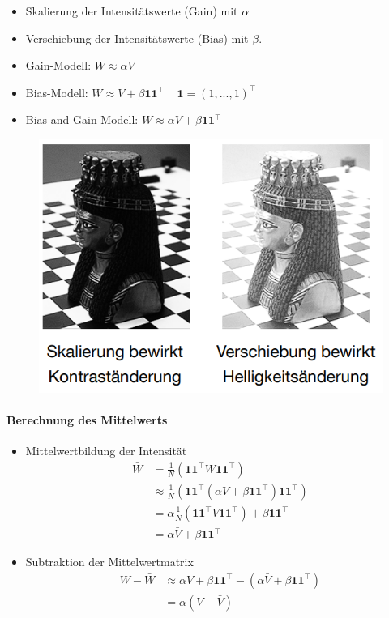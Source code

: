 \documentclass[12pt, a4paper, oneside]{article}
\begin{document}
\begin{itemize}
  \item Skalierung der Intensitätswerte (Gain) mit $\alpha$
  \item Verschiebung der Intensitätswerte (Bias) mit $\beta$.
  \item Gain-Modell: $W\approx\alpha V$
  \item Bias-Modell: $W\approx V+\beta\mathbf{1}\mathbf{1}^\top\;\;\;\;\mathbf{1}=(1,...,1)^\top$ 
  \item Bias-and-Gain Modell: $W\approx\alpha V+\beta \mathbf{1} \mathbf{1}^\top$
\end{itemize}
\begin{figure}[htbp]
    \centering
    \includegraphics[scale=0.6]{../img/1-19.png}
    \label{img/1-19}
\end{figure}

\paragraph*{Berechnung des Mittelwerts}
\begin{itemize}
  \item Mittelwertbildung der Intensität
  \begin{align*}
      \bar W & = \frac{1}{N}(\mathbf{1}\mathbf{1}^\top W\mathbf{1}\mathbf{1}^\top) \\
      & \approx \frac{1}{N}(\mathbf{1}\mathbf{1}^\top (\alpha V+\beta \mathbf{1}\mathbf{1}^\top)\mathbf{1}\mathbf{1}^\top) \\
      & = \alpha\frac{1}{N}(\mathbf{1}\mathbf{1}^\top V\mathbf{1}\mathbf{1}^\top)+\beta\mathbf{1}\mathbf{1}^\top \\
      & = \alpha\bar V+\beta\mathbf{1}\mathbf{1}^\top
  \end{align*}
  \item Subtraktion der Mittelwertmatrix
  \begin{align*}
      W-\bar W & \approx\alpha V+\beta\mathbf{1}\mathbf{1}^\top-(\alpha\bar V+\beta\mathbf{1}\mathbf{1}^\top) \\
      & =\alpha(V-\bar V)
  \end{align*}
\end{itemize}
\end{document}
